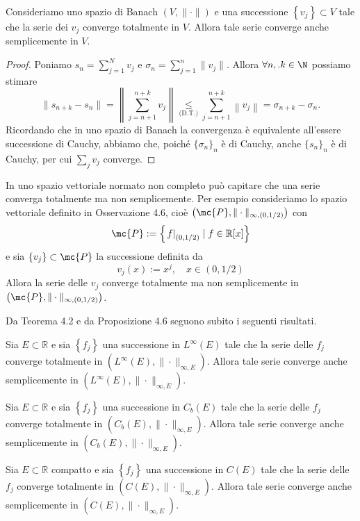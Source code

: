 \begin{proposition}[$*$]\label{prop: 4.6}
Consideriamo uno spazio di Banach $(V,\|\cdot\|)$ e una successione $\left\{v_{j}\right\} \subset V$ tale che la serie dei $v_{j}$ converge totalmente in $V$. Allora tale serie converge anche semplicemente in $V$.
\end{proposition}
\begin{proof}
    Poniamo $s_n=\sum_{j=1}^Nv_j$ e $\sigma_n = \sum_{j=1}^n\|v_j\|$. Allora $\forall n,.k\in\N$ possiamo stimare
    \[\|s_{n+k}-s_n\| = \left\|\sum_{j=n+1}^{n+k}v_j\right\|\underset{\text{(D.T.)}}{\leq} \sum_{j=n+1}^{n+k}\left\|v_j\right\| = \sigma_{n+k}-\sigma_n.\]
    Ricordando che in uno spazio di Banach la convergenza è equivalente all'essere successione di Cauchy, abbiamo che, poiché $\{\sigma_n\}_n$ è di Cauchy, anche $\{s_n\}_n$ è di Cauchy, per cui $\sum_jv_j$ converge.
\end{proof}

\begin{oss}
    In uno spazio vettoriale normato non completo può capitare che una serie converga totalmente ma non semplicemente. Per esempio consideriamo lo spazio vettoriale definito in Osservazione 4.6, cioè $\left(\mc{P},\|\cdot\|_{\infty,(0,1 / 2)}\right)$ con
    \[\mc{P}:=\left\{\left.f\right|_{(0,1 / 2)} \mid f \in \mathbb{R}[x]\right\}\]
    e sia $\left\{v_{j}\right\} \subset \mc{P}$ la successione definita da
    \[v_{j}(x):=x^{j}, \quad x \in(0,1 / 2)\]
    Allora la serie delle $v_{j}$ converge totalmente ma non semplicemente in $\left(\mc{P},\|\cdot\|_{\infty,(0,1 / 2)}\right)$.
\end{oss}

Da Teorema 4.2 e da Proposizione 4.6 seguono subito i seguenti risultati.

\begin{corollary}[$\circ$]
    Sia $E \subset \mathbb{R}$ e sia $\left\{f_{j}\right\}$ una successione in $L^{\infty}(E)$ tale che la serie delle $f_{j}$ converge totalmente in $\left(L^{\infty}(E),\|\cdot\|_{\infty, E}\right)$. Allora tale serie converge anche semplicemente in $\left(L^{\infty}(E),\|\cdot\|_{\infty, E}\right)$.
\end{corollary}
    
\begin{corollary}[$\circ$]
    Sia $E \subset \mathbb{R}$ e sia $\left\{f_{j}\right\}$ una successione in $C_{b}(E)$ tale che la serie delle $f_{j}$ converge totalmente in $\left(C_{b}(E),\|\cdot\|_{\infty, E}\right)$. Allora tale serie converge anche semplicemente in $\left(C_{b}(E),\|\cdot\|_{\infty, E}\right)$.
\end{corollary}
\begin{corollary}[$\circ$]
    Sia $E \subset \mathbb{R}$ compatto e sia $\left\{f_{j}\right\}$ una successione in $C(E)$ tale che la serie delle $f_{j}$ converge totalmente in $\left(C(E),\|\cdot\|_{\infty, E}\right)$. Allora tale serie converge anche semplicemente in $\left(C(E),\|\cdot\|_{\infty, E}\right)$.
\end{corollary}

